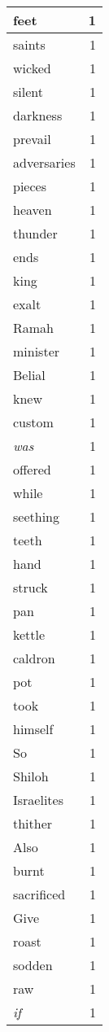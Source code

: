 \begin{center}
\begin{longtable}{l|r}
feet & 1 \\ \hline
saints & 1 \\ \hline
wicked & 1 \\ \hline
silent & 1 \\ \hline
darkness & 1 \\ \hline
prevail & 1 \\ \hline
adversaries & 1 \\ \hline
pieces & 1 \\ \hline
heaven & 1 \\ \hline
thunder & 1 \\ \hline
ends & 1 \\ \hline
king & 1 \\ \hline
exalt & 1 \\ \hline
Ramah & 1 \\ \hline
minister & 1 \\ \hline
Belial & 1 \\ \hline
knew & 1 \\ \hline
custom & 1 \\ \hline
\emph{was} & 1 \\ \hline
offered & 1 \\ \hline
while & 1 \\ \hline
seething & 1 \\ \hline
teeth & 1 \\ \hline
hand & 1 \\ \hline
struck & 1 \\ \hline
pan & 1 \\ \hline
kettle & 1 \\ \hline
caldron & 1 \\ \hline
pot & 1 \\ \hline
took & 1 \\ \hline
himself & 1 \\ \hline
So & 1 \\ \hline
Shiloh & 1 \\ \hline
Israelites & 1 \\ \hline
thither & 1 \\ \hline
Also & 1 \\ \hline
burnt & 1 \\ \hline
sacrificed & 1 \\ \hline
Give & 1 \\ \hline
roast & 1 \\ \hline
sodden & 1 \\ \hline
raw & 1 \\ \hline
\emph{if} & 1 \\ \hline

\end{longtable}
\end{center}
